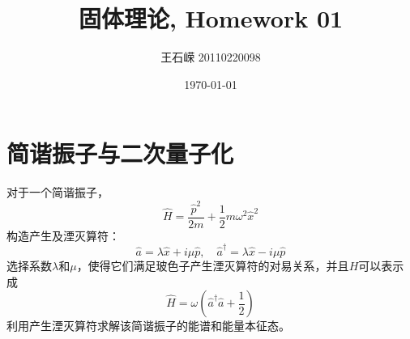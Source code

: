 \documentclass[a4paper]{article}
\title{固体理论, Homework 01}
\author{王石嵘 20110220098}
\date{\today} %
\numberwithin{equation}{section}
\begin{document}
\maketitle





\section{简谐振子与二次量子化}
对于一个简谐振子，
\begin{equation}\label{key}
	\hat H = \frac{\hat p^2}{2m}+\frac12m\omega^2\hat x^2
\end{equation}
构造产生及湮灭算符：
\begin{equation}\label{key}
	\hat a = \lambda \hat x + i\mu \hat p,
	\quad \hat a^\dagger = \lambda \hat x - i\mu \hat p
\end{equation}
选择系数$ \lambda $和$\mu $，使得它们满足玻色子产生湮灭算符的对易关系，并且$ H $可以表示成
\begin{equation}\label{key}
	\hat H = \omega\left(\hat a^\dagger \hat a + \frac{1}{2}\right)
\end{equation}
利用产生湮灭算符求解该简谐振子的能谱和能量本征态。
\end{document}
